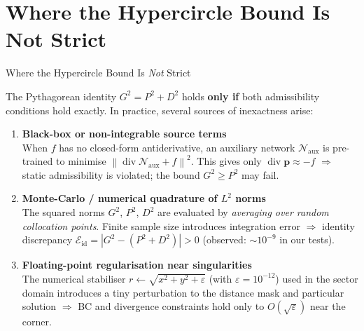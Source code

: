 \documentclass[10pt,aspectratio=169]{beamer}
\DeclareMathOperator{\divg}{div}
\newcommand{\norm}[1]{\left\|#1\right\|}
\newcommand{\myalert}[1]{\textcolor{red!70!black}{#1}}
\begin{document}
\section{Where the Hypercircle Bound Is Not Strict}

\begin{frame}{Where the Hypercircle Bound Is \emph{Not} Strict}

  The Pythagorean identity $G^2 = P^2 + D^2$ holds \textbf{only if} both
  admissibility conditions hold exactly. In practice, several sources of
  inexactness arise:

  \medskip
  \begin{enumerate}\setlength\itemsep{8pt}

    \item \textbf{Black-box or non-integrable source terms} \\
          When $f$ has no closed-form antiderivative, an auxiliary network
          $\mathcal{N}_{\text{aux}}$ is pre-trained to minimise
          $\norm{\divg\mathcal{N}_{\text{aux}} + f}^2$.
          This gives only $\divg\mathbf{p} \approx -f$
          $\Rightarrow$ \myalert{static admissibility is violated};
          the bound $G^2 \ge P^2$ may fail.

    \item \textbf{Monte-Carlo / numerical quadrature of $L^2$ norms} \\
          The squared norms $G^2$, $P^2$, $D^2$ are evaluated by
          \emph{averaging over random collocation points}. Finite sample
          size introduces integration error
          $\Rightarrow$ \myalert{identity discrepancy $\mathcal{E}_{\text{id}}
          = |G^2 - (P^2+D^2)| > 0$} (observed: $\sim 10^{-9}$ in our tests).

    \item \textbf{Floating-point regularisation near singularities} \\
          The numerical stabiliser $r \leftarrow \sqrt{x^2+y^2+\varepsilon}$
          (with $\varepsilon = 10^{-12}$) used in the sector domain
          introduces a tiny perturbation to the distance mask and particular
          solution $\Rightarrow$ \myalert{BC and divergence constraints hold
          only to $O(\sqrt{\varepsilon})$} near the corner.


\end{enumerate}
\end{frame}
\end{document}
